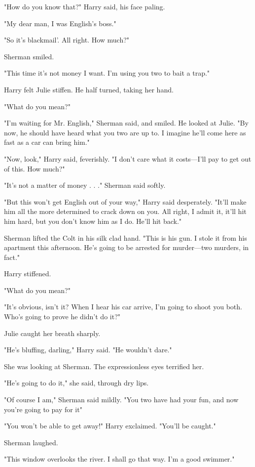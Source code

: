 \documentclass{novel}
\begin{document}
"How do you know that?" Harry said, his face paling.

"My dear man, I was English's boss."

"So it's blackmail'. All right. How much?"

Sherman smiled.

"This time it's not money I want. I'm using you two to bait a trap."

Harry felt Julie stiffen. He half turned, taking her hand.

"What do you mean?"

"I'm waiting for Mr. English," Sherman said, and smiled. He looked at Julie. "By now, he should have heard what you two are up to. I imagine he'll come here as fast as a car can bring him."

"Now, look," Harry said, feverishly. "I don't care what it costs—I'll pay to get out of this. How much?"

"It's not a matter of money . . ." Sherman said softly.

"But this won't get English out of your way," Harry said desperately. "It'll make him all the more determined to crack down on you. All right, I admit it, it'll hit him hard, but you don't know him as I do. He'll hit back."

Sherman lifted the Colt in his silk clad hand. "This is his gun. I stole it from his apartment this afternoon. He's going to be arrested for murder—two murders, in fact."

Harry stiffened.

"What do you mean?"

"It's obvious, isn't it? When I hear his car arrive, I'm going to shoot you both. Who's going to prove he didn't do it?"

Julie caught her breath sharply.

"He's bluffing, darling," Harry said. "He wouldn't dare."

She was looking at Sherman. The expressionless eyes terrified her.

"He's going to do it," she said, through dry lips.

"Of course I am," Sherman said mildly. "You two have had your fun, and now you're going to pay for it"

"You won't be able to get away!" Harry exclaimed. "You'll be caught."

Sherman laughed.

"This window overlooks the river. I shall go that way. I'm a good swimmer."
\end{document}
